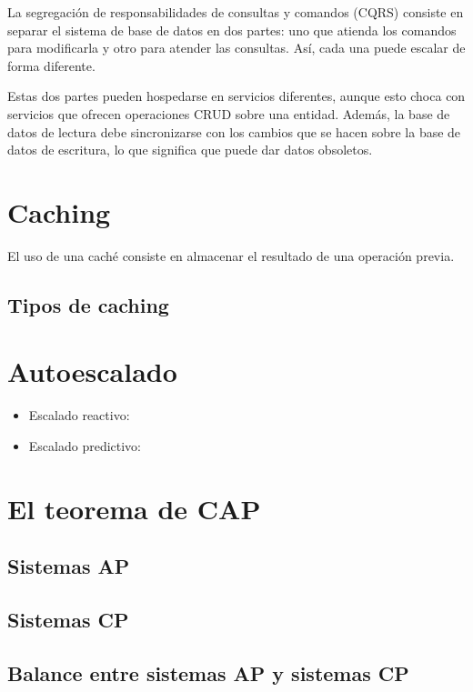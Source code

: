 \documentclass[11pt,a4paper]{article}
\begin{document}
La segregación de responsabilidades de consultas y comandos (CQRS) consiste en separar el sistema de base de datos en dos partes: uno que atienda los comandos para modificarla y otro para atender las consultas. Así, cada una puede escalar de forma diferente. 

Estas dos partes pueden hospedarse en servicios diferentes, aunque esto choca con servicios que ofrecen operaciones CRUD sobre una entidad. Además, la base de datos de lectura debe sincronizarse con los cambios que se hacen sobre la base de datos de escritura, lo que significa que puede dar datos obsoletos.

\section{Caching}

El uso de una caché consiste en almacenar el resultado de una operación previa.

\subsection{Tipos de caching}

\section{Autoescalado}

\begin{itemize}
\item Escalado reactivo:
\item Escalado predictivo:
\end{itemize}

\section{El teorema de CAP}

\subsection{Sistemas AP}

\subsection{Sistemas CP}

\subsection{Balance entre sistemas AP y sistemas CP}
\end{document}
